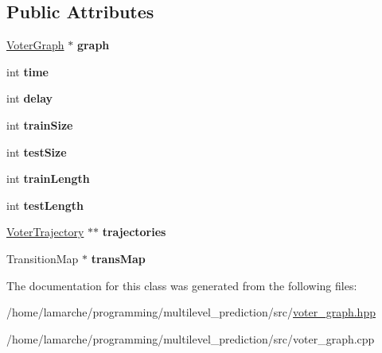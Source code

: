 \subsection*{Public Attributes}
\begin{DoxyCompactItemize}
\item 
\hypertarget{class_voter_data_set_afc4d76589e0112bb5c8e30730074231e}{\hyperlink{class_voter_graph}{Voter\-Graph} $\ast$ {\bfseries graph}}\label{class_voter_data_set_afc4d76589e0112bb5c8e30730074231e}

\item 
\hypertarget{class_voter_data_set_a50a2e44a9d6d99d3254e3da816f76aff}{int {\bfseries time}}\label{class_voter_data_set_a50a2e44a9d6d99d3254e3da816f76aff}

\item 
\hypertarget{class_voter_data_set_a32c0fb1d14c53d2c10a28463f9e44a7f}{int {\bfseries delay}}\label{class_voter_data_set_a32c0fb1d14c53d2c10a28463f9e44a7f}

\item 
\hypertarget{class_voter_data_set_a8aadcc50a4094f7d43f3172c70ae5f73}{int {\bfseries train\-Size}}\label{class_voter_data_set_a8aadcc50a4094f7d43f3172c70ae5f73}

\item 
\hypertarget{class_voter_data_set_a068aae3fc53a52217cc9014ba21090dd}{int {\bfseries test\-Size}}\label{class_voter_data_set_a068aae3fc53a52217cc9014ba21090dd}

\item 
\hypertarget{class_voter_data_set_ad7cb5062b8c67a26ee50939d54027748}{int {\bfseries train\-Length}}\label{class_voter_data_set_ad7cb5062b8c67a26ee50939d54027748}

\item 
\hypertarget{class_voter_data_set_a89ce0e2c44631818736ca7f71056f6c0}{int {\bfseries test\-Length}}\label{class_voter_data_set_a89ce0e2c44631818736ca7f71056f6c0}

\item 
\hypertarget{class_voter_data_set_a07299f2883a8ec069d9821a877351725}{\hyperlink{class_voter_trajectory}{Voter\-Trajectory} $\ast$$\ast$ {\bfseries trajectories}}\label{class_voter_data_set_a07299f2883a8ec069d9821a877351725}

\item 
\hypertarget{class_voter_data_set_a0f0ee88cf6290a0a679982a5fef315b0}{Transition\-Map $\ast$ {\bfseries trans\-Map}}\label{class_voter_data_set_a0f0ee88cf6290a0a679982a5fef315b0}

\end{DoxyCompactItemize}


The documentation for this class was generated from the following files\-:\begin{DoxyCompactItemize}
\item 
/home/lamarche/programming/multilevel\-\_\-prediction/src/\hyperlink{voter__graph_8hpp}{voter\-\_\-graph.\-hpp}\item 
/home/lamarche/programming/multilevel\-\_\-prediction/src/voter\-\_\-graph.\-cpp\end{DoxyCompactItemize}
